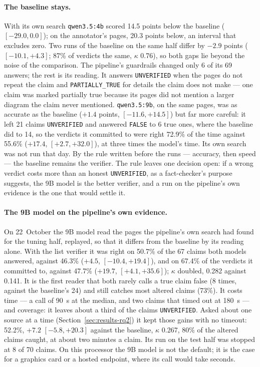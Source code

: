 \paragraph{The baseline stays.} With its own search \texttt{qwen3.5:4b}
scored 14.5 points below the baseline ($[-29.0, 0.0]$); on the
annotator's pages, 20.3 points below, an interval that excludes zero.
Two runs of the baseline on the same half differ by $-2.9$ points
($[-10.1, +4.3]$; 87\% of verdicts the same, $\kappa$ 0.76), so both
gaps lie beyond the noise of the comparison. The pipeline's guardrails
changed only 6 of its 69 answers; the rest is its reading. It answers
\texttt{UNVERIFIED} when the pages do not repeat the claim and
\texttt{PARTIALLY\_TRUE} for details the claim does not make --- one
claim was marked partially true because its pages did not mention a
larger diagram the claim never mentioned. \texttt{qwen3.5:9b}, on the same pages, was as accurate as the baseline
($+1.4$ points, $[-11.6, +14.5]$) but far more careful: it left 21
claims \texttt{UNVERIFIED} and answered \texttt{FALSE} to 6 true ones,
where the baseline did to 14, so the verdicts it committed to were right
72.9\% of the time against 55.6\% ($+17.4$, $[+2.7, +32.0]$), at three
times the model's time. Its own search was not run that day. By the
rule written before the runs --- accuracy, then speed --- the baseline
remains the verifier. The rule leaves one decision open: if a wrong
verdict costs more than an honest \texttt{UNVERIFIED}, as a
fact-checker's purpose suggests, the 9B model is the better verifier,
and a run on the pipeline's own evidence is the one that would settle
it.

\paragraph{The 9B model on the pipeline's own evidence.} On
22~October the 9B model read the pages the pipeline's own search had
found for the tuning half, replayed, so that it differs from the
baseline by its reading alone. With the list verifier it was right on
50.7\% of the 67 claims both models answered, against 46.3\% ($+4.5$,
$[-10.4, +19.4]$), and on 67.4\% of the verdicts it committed to,
against 47.7\% ($+19.7$, $[+4.1, +35.6]$); $\kappa$ doubled, 0.282
against 0.141. It is the first reader that both rarely calls a true
claim false (8 times, against the baseline's 24) and still catches most
altered claims (73\%). It costs time --- a call of 90~s at the median,
and two claims that timed out at 180~s --- and coverage: it leaves about
a third of the claims \texttt{UNVERIFIED}. Asked about one source at a
time (Section~\ref{sec:results-rq2}) it kept those gains with no
timeout: 52.2\%, $+7.2$ $[-5.8, +20.3]$ against the baseline, $\kappa$
0.267, 80\% of the altered claims caught, at about two minutes a claim.
Its run on the test half was stopped at 8 of 70 claims. On this
processor the 9B model is not the default; it is the case for a
graphics card or a hosted endpoint, where its call would take seconds.


